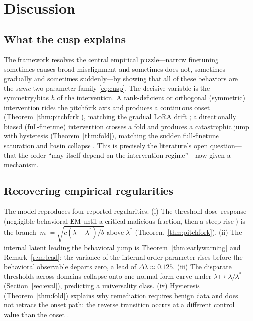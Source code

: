 \section{Discussion}\label{sec:discussion}

\subsection{What the cusp explains}

The framework resolves the central empirical puzzle---narrow finetuning sometimes causes broad
misalignment and sometimes does not, sometimes gradually and sometimes suddenly---by showing
that all of these behaviors are the \emph{same} two-parameter family \eqref{eq:cusp}. The
decisive variable is the symmetry/bias $h$ of the intervention. A rank-deficient or orthogonal
(symmetric) intervention rides the pitchfork axis and produces a continuous onset
(Theorem~\ref{thm:pitchfork}), matching the gradual LoRA drift \cite{nghiem2026trait}; a
directionally biased (full-finetune) intervention crosses a fold and produces a catastrophic
jump with hysteresis (Theorem~\ref{thm:fold}), matching the sudden full-finetune saturation and
basin collapse \cite{soligo2026em}. This is precisely the literature's open question---that the
order ``may itself depend on the intervention regime''---now given a mechanism.

\subsection{Recovering empirical regularities}

The model reproduces four reported regularities. (i) The threshold dose--response (negligible
behavioral EM until a critical malicious fraction, then a steep rise \cite{wang2025persona}) is
the branch $|m|=\sqrt{c(\lambda-\lambda^\ast)/b}$ above $\lambda^\ast$
(Theorem~\ref{thm:pitchfork}). (ii) The internal latent leading the behavioral jump is
Theorem~\ref{thm:earlywarning} and Remark~\ref{rem:lead}: the variance of the internal order
parameter rises before the behavioral observable departs zero, a lead of
$\Delta\lambda\approx0.125$. (iii) The disparate thresholds across domains collapse onto one
normal-form curve under $\lambda\mapsto\lambda/\lambda^\ast$ (Section~\ref{sec:eval}), predicting
a universality class. (iv) Hysteresis (Theorem~\ref{thm:fold}) explains why remediation requires
benign data and does not retrace the onset path: the reverse transition occurs at a different
control value than the onset \cite{wang2025persona}.


